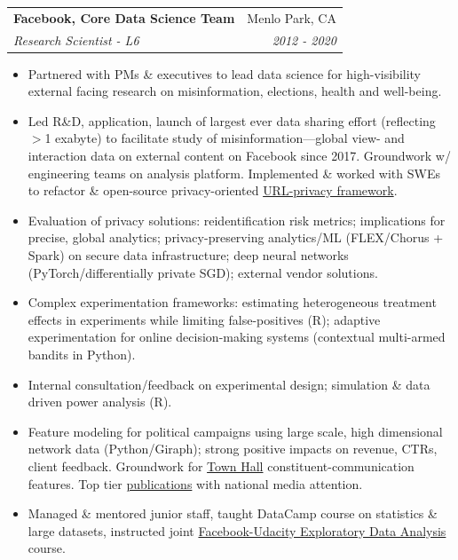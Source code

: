 \documentclass[letterpaper,11pt]{article}
\makeatletter
\newcommand{\resitem}[1]{\item #1 \vspace{-6pt}}
\newcommand{\ressubheading}[4]{\vspace{2pt}
\begin{tabular*}{7.58in}{l@{\extracolsep{\fill}}r}
		\textbf{#1} & #2 \\
		\textit{#3} & \textit{#4} \\
\end{tabular*}\vspace{-1pt}}
\makeatother
\begin{document}
\ressubheading{Facebook, Core Data Science Team}{Menlo Park, CA}{Research Scientist - L6}{2012 - 2020}
	\begin{itemize}
       	 	\resitem{Partnered with PMs \& executives to lead data science for high-visibility external facing research on misinformation, elections, health and well-being.} 
		\resitem{Led R\&D, application, launch of largest ever data sharing effort (reflecting $>$1 exabyte) to facilitate study of misinformation---global view- and interaction data on external content on Facebook since 2017. Groundwork w/ engineering teams on analysis platform. Implemented \& worked with SWEs to refactor \& open-source privacy-oriented \href{https://github.com/facebookresearch/URL-Sanitization}{URL-privacy framework}.}
		\resitem{Evaluation of privacy solutions: reidentification risk metrics; implications for precise, global analytics; privacy-preserving analytics/ML (FLEX/Chorus + Spark) on secure data infrastructure; deep neural networks (PyTorch/differentially private SGD); external vendor solutions.}
		\resitem{Complex experimentation frameworks: estimating heterogeneous treatment effects in experiments while limiting false-positives (R); adaptive experimentation for online decision-making systems (contextual multi-armed bandits in Python).}
		\resitem{Internal consultation/feedback on experimental design; simulation \& data driven power analysis (R).}
		\resitem{Feature modeling for political campaigns using large scale, high dimensional network data (Python/Giraph); strong positive impacts on revenue, CTRs, client feedback. Groundwork for \href{https://www.facebook.com/townhall/}{Town Hall} constituent-communication features. Top tier \href{https://solomonmg.github.io/pdf/Science-2015-Bakshy-1130-2.pdf}{publications} with national media attention. }
		\resitem{Managed \& mentored junior staff, taught DataCamp course on statistics \& large datasets, instructed joint \href{https://www.udacity.com/course/data-analysis-with-r--ud651}{Facebook-Udacity Exploratory Data Analysis} course.}
	\end{itemize}
\end{document}
